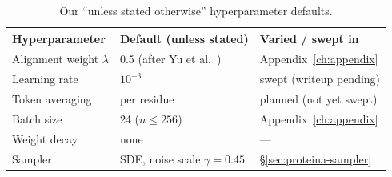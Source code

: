 \begin{table}[tbp]
\centering
\small
\begin{tabular}{l l l}
\toprule
\textbf{Hyperparameter} & \textbf{Default (unless stated)} & \textbf{Varied / swept in} \\
\midrule
Alignment weight $\lambda$ & 0.5 (after Yu et al.~\cite{REPA}) & Appendix~\ref{ch:appendix} \\
Learning rate              & $10^{-3}$                         & swept (writeup pending) \\
Token averaging            & per residue                       & planned (not yet swept) \\
Batch size                 & 24 ($n{\le}256$)                    & Appendix~\ref{ch:appendix} \\
Weight decay               & none                              & --- \\
Sampler                    & SDE, noise scale $\gamma = 0.45$  & \S\ref{sec:proteina-sampler} \\
\bottomrule
\end{tabular}
\caption{Our ``unless stated otherwise'' hyperparameter defaults.}
\label{tab:setup-hparams}
\end{table}
